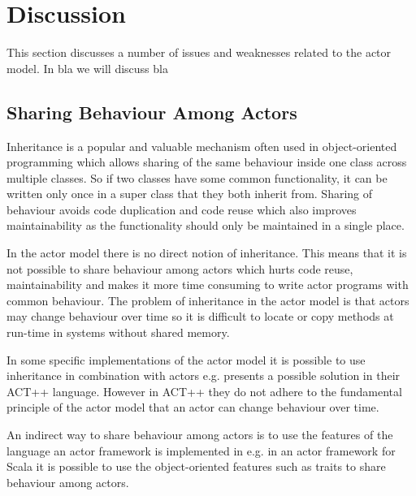 \section{Discussion}\label{sec:actor_discussion}
This section discusses a number of issues and weaknesses related to the actor model. In bla we will discuss bla 

\subsection{Sharing Behaviour Among Actors}
Inheritance is a popular and valuable mechanism often used in object-oriented programming which allows sharing of the same behaviour inside one class across multiple classes\cite{kafura1989inheritance}. So if two classes have some common functionality, it can be written only once in a super class that they both inherit from. Sharing of behaviour avoids code duplication and code reuse which also improves maintainability as the functionality should only be maintained in a single place.

In the actor model there is no direct notion of inheritance\cite{mackay1997has}. This means that it is not possible to share behaviour among actors which hurts code reuse, maintainability and makes it more time consuming to write actor programs with common behaviour. The problem of inheritance in the actor model is that actors may change behaviour over time so it is difficult to locate or copy methods at run-time in systems without shared memory\cite{kafura1989inheritance}.

In some specific implementations of the actor model it is possible to use inheritance in combination with actors e.g. \cite{kafura1989inheritance} presents a possible solution in their ACT++ language. However in ACT++ they do not adhere to the fundamental principle of the actor model that an actor can change behaviour over time. 

An indirect way to share behaviour among actors is to use the features of the language an actor framework is implemented in e.g. in an actor framework for Scala it is possible to use the object-oriented features such as traits to share behaviour among actors.

